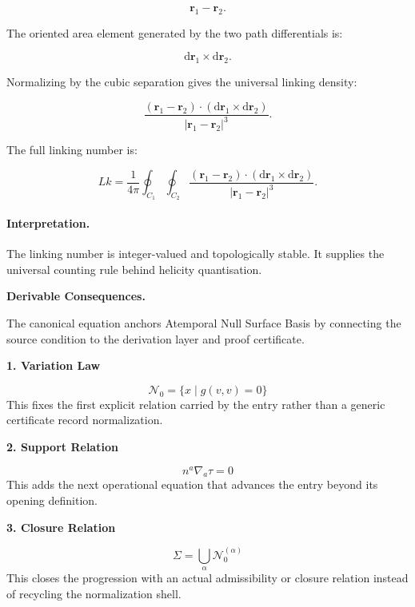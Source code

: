 \begin{equation}
\mathbf{r}_1-\mathbf{r}_2 .
\end{equation}

The oriented area element generated by the two path differentials is:

\begin{equation}
\mathrm{d}\mathbf{r}_1\times \mathrm{d}\mathbf{r}_2 .
\end{equation}

Normalizing by the cubic separation gives the universal linking density:

\begin{equation}
\frac{
(\mathbf{r}_1-\mathbf{r}_2)
\cdot
(\mathrm{d}\mathbf{r}_1\times \mathrm{d}\mathbf{r}_2)
}{
|\mathbf{r}_1-\mathbf{r}_2|^3
}.
\end{equation}

The full linking number is:

\begin{equation}
\boxed{
Lk
=
\frac{1}{4\pi}
\oint_{C_1}
\oint_{C_2}
\frac{
(\mathbf{r}_1-\mathbf{r}_2)
\cdot
(\mathrm{d}\mathbf{r}_1\times \mathrm{d}\mathbf{r}_2)
}{
|\mathbf{r}_1-\mathbf{r}_2|^3
}.
}
\end{equation}

\paragraph{Interpretation.}
The linking number is integer-valued and topologically stable. It supplies the universal counting rule behind helicity quantisation.

\par\vspace{0.35em}
\noindent\textbf{Derivable Consequences.}\quad
\begingroup
\footnotesize
\raggedright
The canonical equation anchors Atemporal Null Surface Basis by connecting the source condition to the derivation layer and proof certificate.
\par\endgroup

\noindent\textbf{1. Variation Law}\par
\[
\mathcal{N}_{0}=\{x\mid g(v,v)=0\}
\]
\noindent This fixes the first explicit relation carried by the entry rather than a generic certificate record normalization.\par
\noindent\textbf{2. Support Relation}\par
\[
n^{a}\nabla_{a}\tau=0
\]
\noindent This adds the next operational equation that advances the entry beyond its opening definition.\par
\noindent\textbf{3. Closure Relation}\par
\[
\Sigma=\bigcup_{\alpha}\mathcal{N}_{0}^{(\alpha)}
\]
\noindent This closes the progression with an actual admissibility or closure relation instead of recycling the normalization shell.\par

